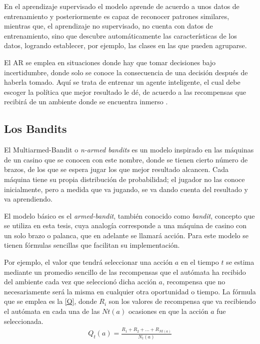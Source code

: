 En el aprendizaje supervisado el modelo aprende de acuerdo a unos datos de entrenamiento y posteriormente es capaz de reconocer patrones similares, mientras que, el aprendizaje no supervisado, no cuenta con datos de entrenamiento, sino que descubre automáticamente las características de los datos, logrando establecer, por ejemplo, las clases en las que pueden agruparse.

El AR se emplea en situaciones donde hay que tomar decisiones bajo incertidumbre, donde solo se conoce la consecuencia de una decisión después de haberla tomado. Aquí se trata de entrenar un agente inteligente, el cual debe escoger la política que mejor resultado le dé, de acuerdo a las recompensas que recibirá de un ambiente donde se encuentra inmerso \citep{sutton1992reinforcement}.

\subsection{Los Bandits}
\label{Los Bandits}

El Multiarmed-Bandit o \textit{n-armed bandits} es un modelo inspirado en las máquinas de un casino que se conocen con este nombre, donde se tienen cierto número de brazos, de los que se espera jugar los que mejor resultado alcancen. Cada máquina tiene su propia distribución de probabilidad; el jugador no las conoce inicialmente, pero a medida que va jugando, se va dando cuenta del resultado y va aprendiendo.

El modelo básico es el \textit{armed-bandit}, también conocido como \textit{bandit}, concepto que se utiliza en esta tesis, cuya analogía corresponde a una máquina de casino con un solo brazo o palanca, que en adelante se llamará acción. Para este modelo se tienen fórmulas sencillas que facilitan su implementación. 

Por ejemplo, el valor que tendrá seleccionar una acción $a$ en el tiempo $t$ se estima mediante un promedio sencillo de las recompensas que el autómata ha recibido del ambiente cada vez que seleccionó dicha acción $a$, recompensa que no necesariamente será la misma en cualquier otra oportunidad o tiempo. La fórmula que se emplea es la \ref{Q}, donde $R_i$ son los valores de recompensa que va recibiendo el autómata en cada una de las $Nt(a)$ ocasiones en que la acción $a$ fue seleccionada.
\begin{eqnarray}\label{Q}
Q_t(a) = \frac{R_1+R_2+ ...+R_{Nt(a)}}{N_t(a)}
\end{eqnarray}

